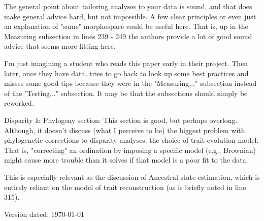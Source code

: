 \documentclass[12pt,letterpaper]{article}
\begin{document}

The general point about tailoring analyses to your data is sound, and that does make general advice hard, but not impossible. A few clear principles or even just an explanation of "same" morphospace could be useful here. That is, up in the Measuring subsection in lines 239 - 249 the authors provide a lot of good sound advice that seems more fitting here. 


I'm just imagining a student who reads this paper early in their project. Then later, once they have data, tries to go back to look up some best practices and misses some good tips because they were in the "Measuring..." subsection instead of the "Testing..." subsection. It may be that the subsections should simply be reworked.


Disparity \& Phylogeny section: This section is good, but perhaps overlong. Although, it doesn't discuss (what I perceive to be) the biggest problem with phylogenetic corrections to disparity analyses: the choice of trait evolution model.
That is, "correcting" an ordination by imposing a specific model (e.g., Brownian) might cause more trouble than it solves if that model is a poor fit to the data.


This is especially relevant as the discussion of Ancestral state estimation, which is entirely reliant on the model of trait reconstruction (as is briefly noted in line 315).





\begin{flushright}
Version dated: \today
\end{flushright}
\end{document}

